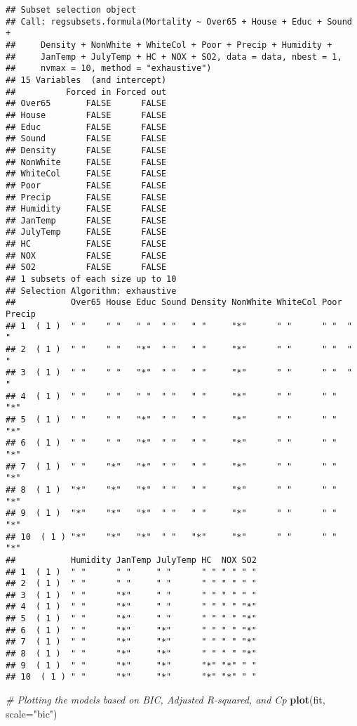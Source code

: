 \documentclass[
]{article}
\newenvironment{Shaded}{\begin{snugshade}}{\end{snugshade}}
\newcommand{\AttributeTok}[1]{\textcolor[rgb]{0.13,0.29,0.53}{#1}}
\newcommand{\CommentTok}[1]{\textcolor[rgb]{0.56,0.35,0.01}{\textit{#1}}}
\newcommand{\FunctionTok}[1]{\textcolor[rgb]{0.13,0.29,0.53}{\textbf{#1}}}
\newcommand{\NormalTok}[1]{#1}
\newcommand{\StringTok}[1]{\textcolor[rgb]{0.31,0.60,0.02}{#1}}
\begin{document}
\begin{verbatim}
## Subset selection object
## Call: regsubsets.formula(Mortality ~ Over65 + House + Educ + Sound + 
##     Density + NonWhite + WhiteCol + Poor + Precip + Humidity + 
##     JanTemp + JulyTemp + HC + NOX + SO2, data = data, nbest = 1, 
##     nvmax = 10, method = "exhaustive")
## 15 Variables  (and intercept)
##          Forced in Forced out
## Over65       FALSE      FALSE
## House        FALSE      FALSE
## Educ         FALSE      FALSE
## Sound        FALSE      FALSE
## Density      FALSE      FALSE
## NonWhite     FALSE      FALSE
## WhiteCol     FALSE      FALSE
## Poor         FALSE      FALSE
## Precip       FALSE      FALSE
## Humidity     FALSE      FALSE
## JanTemp      FALSE      FALSE
## JulyTemp     FALSE      FALSE
## HC           FALSE      FALSE
## NOX          FALSE      FALSE
## SO2          FALSE      FALSE
## 1 subsets of each size up to 10
## Selection Algorithm: exhaustive
##           Over65 House Educ Sound Density NonWhite WhiteCol Poor Precip
## 1  ( 1 )  " "    " "   " "  " "   " "     "*"      " "      " "  " "   
## 2  ( 1 )  " "    " "   "*"  " "   " "     "*"      " "      " "  " "   
## 3  ( 1 )  " "    " "   "*"  " "   " "     "*"      " "      " "  " "   
## 4  ( 1 )  " "    " "   " "  " "   " "     "*"      " "      " "  "*"   
## 5  ( 1 )  " "    " "   "*"  " "   " "     "*"      " "      " "  "*"   
## 6  ( 1 )  " "    " "   "*"  " "   " "     "*"      " "      " "  "*"   
## 7  ( 1 )  " "    "*"   "*"  " "   " "     "*"      " "      " "  "*"   
## 8  ( 1 )  "*"    "*"   "*"  " "   " "     "*"      " "      " "  "*"   
## 9  ( 1 )  "*"    "*"   "*"  " "   " "     "*"      " "      " "  "*"   
## 10  ( 1 ) "*"    "*"   "*"  " "   "*"     "*"      " "      " "  "*"   
##           Humidity JanTemp JulyTemp HC  NOX SO2
## 1  ( 1 )  " "      " "     " "      " " " " " "
## 2  ( 1 )  " "      " "     " "      " " " " " "
## 3  ( 1 )  " "      "*"     " "      " " " " " "
## 4  ( 1 )  " "      "*"     " "      " " " " "*"
## 5  ( 1 )  " "      "*"     " "      " " " " "*"
## 6  ( 1 )  " "      "*"     "*"      " " " " "*"
## 7  ( 1 )  " "      "*"     "*"      " " " " "*"
## 8  ( 1 )  " "      "*"     "*"      " " " " "*"
## 9  ( 1 )  " "      "*"     "*"      "*" "*" " "
## 10  ( 1 ) " "      "*"     "*"      "*" "*" " "
\end{verbatim}

\begin{Shaded}
\begin{Highlighting}[]
\CommentTok{\# Plotting the models based on BIC, Adjusted R{-}squared, and Cp}
\FunctionTok{plot}\NormalTok{(fit, }\AttributeTok{scale=}\StringTok{"bic"}\NormalTok{)}
\end{Highlighting}
\end{Shaded}
\end{document}
